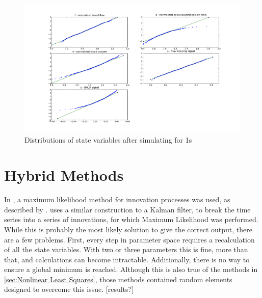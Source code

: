 \begin{figure}
\includegraphics[trim=6cm .75cm 6cm .75cm,width=16cm]{images/gauss_step_1sec_3sigma.pdf}
\caption{Distributions of state variables after simulating for 1s}
\label{fig:trans1s}
\end{figure}

\section{Hybrid Methods}
In \cite{Riera2004}, a maximum
likelihood method for innovation processes was used, as described by
\cite{Ozaki1994}. \cite{Ozaki1994} uses a similar construction to a 
Kalman filter, to break the time series into a series of innovations,
for which Maximum Likelihood was performed. While this is probably the most
likely solution to give the correct output, there are a few problems. First, every
step in parameter space requires a recalculation of all the state variables. With
two or three parameters this is fine, more than that, and calculations can become
intractable. Additionally, there is no way to ensure a global minimum is reached.
Although this is also true of the methods in \autoref{sec:Nonlinear Least Squares},
those methods contained random elements designed to overcome this issue.
[results?]


